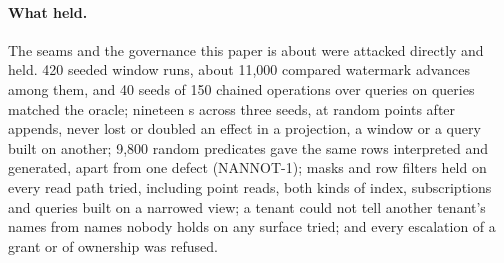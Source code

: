 \documentclass[11pt,a4paper]{article}
\renewcommand{\_}{\oldunderscore\allowbreak}
\newcommand{\code}[1]{\texttt{\pvbreakable{#1}}}
\begin{document}
\paragraph{What held.} The seams and the governance this paper is about were attacked directly and held.
420 seeded window runs, about 11{,}000 compared watermark advances among them, and 40 seeds of 150 chained
operations over queries on queries matched the oracle; nineteen \code{SIGKILL}s across three seeds, at
random points after appends, never lost or doubled an effect in a projection, a window or a query built on
another; 9{,}800 random predicates gave the same rows interpreted and generated, apart from one defect
(NANNOT-1); masks and row filters held on every read path tried, including point reads, both kinds of
index, subscriptions and queries built on a narrowed view; a tenant could not tell another tenant's names
from names nobody holds on any surface tried; and every escalation of a grant or of ownership was refused.
\end{document}
